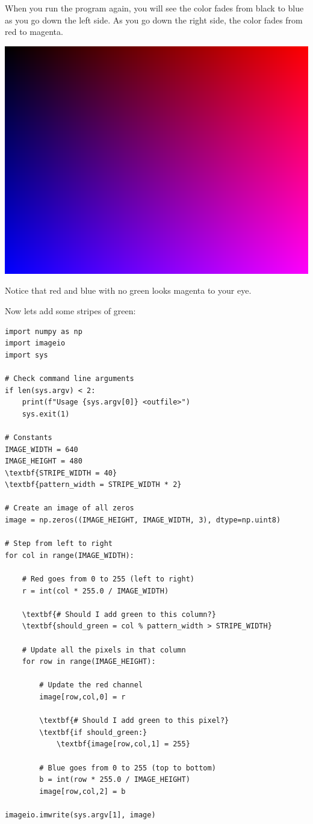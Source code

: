 When you run the program again, you will see the color fades from
black to blue as you go down the left side. As you go down the right
side, the color fades from red to magenta.

\includegraphics[width=0.4\linewidth]{rb.png}

Notice that red and blue with no green looks magenta to your eye.

Now lets add some stripes of green:

\begin{Verbatim}[commandchars=\\\{\}]
import numpy as np
import imageio
import sys

# Check command line arguments
if len(sys.argv) < 2:
    print(f"Usage {sys.argv[0]} <outfile>")
    sys.exit(1)

# Constants
IMAGE_WIDTH = 640
IMAGE_HEIGHT = 480
\textbf{STRIPE_WIDTH = 40}
\textbf{pattern_width = STRIPE_WIDTH * 2}

# Create an image of all zeros
image = np.zeros((IMAGE_HEIGHT, IMAGE_WIDTH, 3), dtype=np.uint8)

# Step from left to right
for col in range(IMAGE_WIDTH):

    # Red goes from 0 to 255 (left to right)
    r = int(col * 255.0 / IMAGE_WIDTH)

    \textbf{# Should I add green to this column?}
    \textbf{should_green = col % pattern_width > STRIPE_WIDTH}

    # Update all the pixels in that column
    for row in range(IMAGE_HEIGHT):

        # Update the red channel
        image[row,col,0] = r

        \textbf{# Should I add green to this pixel?}
        \textbf{if should_green:}
            \textbf{image[row,col,1] = 255}

        # Blue goes from 0 to 255 (top to bottom)
        b = int(row * 255.0 / IMAGE_HEIGHT)
        image[row,col,2] = b

imageio.imwrite(sys.argv[1], image)
\end{Verbatim}

